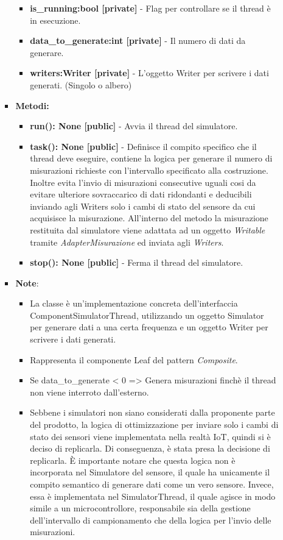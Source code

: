 \begin{itemize}
\begin{itemize}
\begin{itemize}
\begin{itemize}
        \item \textbf{is\_running:bool [private]} - Flag per controllare se il thread è in esecuzione.
        \item \textbf{data\_to\_generate:int [private]} - Il numero di dati da generare.
        \item \textbf{writers:Writer [private]} - L'oggetto Writer per scrivere i dati generati. (Singolo o albero)
        \end{itemize}
    \item \textbf{Metodi: }
        \begin{itemize}
        \item \textbf{run(): None [public]} - Avvia il thread del simulatore.
        \item \textbf{task(): None [public]} - Definisce il compito specifico che il thread deve eseguire, contiene la logica per generare il numero di misurazioni richieste con l'intervallo specificato alla costruzione.
        Inoltre evita l'invio di misurazioni consecutive uguali cosi da evitare ulteriore sovraccarico di dati ridondanti e deducibili inviando agli Writers solo i cambi di stato del sensore da cui acquisisce la misurazione.
        All'interno del metodo la misurazione restituita dal simulatore viene adattata ad un oggetto \textit{Writable} tramite \textit{AdapterMisurazione} ed inviata agli \textit{Writers}.
        \item \textbf{stop(): None [public]} - Ferma il thread del simulatore.
        \end{itemize}
    \item\textbf{Note}:
        \begin{itemize}
            \item La classe è un'implementazione concreta dell'interfaccia ComponentSimulatorThread, utilizzando un oggetto Simulator per generare dati a una certa frequenza e un oggetto Writer per scrivere i dati generati.
            \item Rappresenta il componente Leaf del pattern \textit{Composite}.
            \item Se data\_to\_generate < 0 => Genera misurazioni finchè il thread non viene interroto dall'esterno.
            \item Sebbene i simulatori non siano considerati dalla proponente parte del prodotto, la logica di ottimizzazione per inviare solo i cambi di stato dei sensori viene implementata nella realtà IoT, quindi si è deciso di replicarla. Di conseguenza, è stata presa la decisione di replicarla. È importante notare che questa logica non è incorporata nel Simulatore del sensore, il quale ha unicamente il compito semantico di generare dati come un vero sensore. Invece, essa è implementata nel SimulatorThread, il quale agisce in modo simile a un microcontrollore, responsabile sia della gestione dell'intervallo di campionamento che della logica per l'invio delle misurazioni.

\end{itemize}
\end{itemize}
\end{itemize}
\end{itemize}
